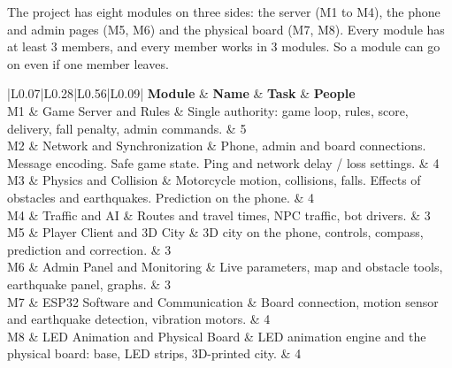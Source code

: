 \documentclass[
  english,
  10pt,
  a4paper,
]{article}
\newcommand{\ckkeep}[1]{\par\noindent\begin{minipage}{\linewidth}\setlength{\parskip}{4pt}#1\end{minipage}\par\smallskip}
\begin{document}
\ckkeep{%
The project has eight modules on three sides: the server (M1 to M4), the phone and admin pages (M5,
M6) and the physical board (M7, M8). Every module has at least 3 members, and every member works in
3 modules. So a module can go on even if one member leaves.

\begin{tabular}{|L{0.07}|L{0.28}|L{0.56}|L{0.09}|}
\hline \textbf{Module} & \textbf{Name} & \textbf{Task} & \textbf{People} \\ \hline 
M1 & Game Server and Rules & Single authority: game loop, rules, score, delivery, fall penalty, admin commands. & 5 \\ \hline
M2 & Network and Synchronization & Phone, admin and board connections. Message encoding. Safe game state. Ping and network delay / loss settings. & 4 \\ \hline
M3 & Physics and Collision & Motorcycle motion, collisions, falls. Effects of obstacles and earthquakes. Prediction on the phone. & 4 \\ \hline
M4 & Traffic and AI & Routes and travel times, NPC traffic, bot drivers. & 3 \\ \hline
M5 & Player Client and 3D City & 3D city on the phone, controls, compass, prediction and correction. & 3 \\ \hline
M6 & Admin Panel and Monitoring & Live parameters, map and obstacle tools, earthquake panel, graphs. & 3 \\ \hline
M7 & ESP32 Software and Communication & Board connection, motion sensor and earthquake detection, vibration motors. & 4 \\ \hline
M8 & LED Animation and Physical Board & LED animation engine and the physical board: base, LED strips, 3D-printed city. & 4 \\ \hline
\end{tabular}}
\end{document}
